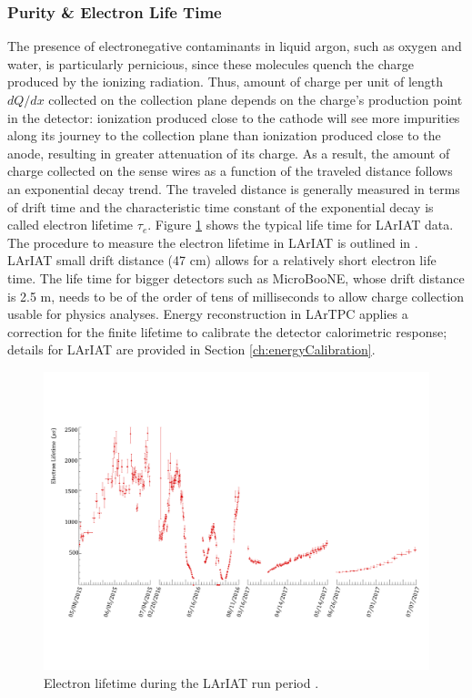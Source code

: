 \subsubsection{Purity \& Electron Life Time }
The presence of electronegative contaminants in liquid argon, such as oxygen and water, is particularly
pernicious, since these molecules quench the charge produced by the ionizing radiation.  Thus, amount of charge per unit of length $dQ/dx$ collected on the collection plane depends on the charge's production point in the detector: ionization produced  close to the cathode will see more impurities along its journey to the collection plane than ionization produced close to the anode, resulting in greater attenuation of its charge. As a result,  the amount of charge collected on the sense wires as a function of the traveled distance follows an exponential decay trend. The traveled distance is generally measured in terms of drift time and the  characteristic time constant of the exponential decay is called electron lifetime $\tau_e$. Figure \ref{fig:Elifetime} shows the typical life time for LArIAT data. The procedure to measure the electron lifetime in LArIAT is outlined in \cite{LArIATLifeTime}. LArIAT small drift distance (47 cm) allows for a relatively short electron life time. The life time for bigger detectors such as MicroBooNE, whose drift distance is 2.5 m, needs to be of the order of tens of milliseconds to allow charge collection usable for physics analyses. Energy reconstruction in LArTPC applies a correction for the finite lifetime to calibrate the detector calorimetric response; details for LArIAT are provided in Section \ref{ch:energyCalibration}.

\begin{figure}[hbpt]
\centering
\includegraphics[width=\textwidth]{Chapter-2/Images/ELifetime.png}
\caption{Electron lifetime during the LArIAT run period \cite{detectorPaper}.}
\label{fig:Elifetime}
\end{figure}


